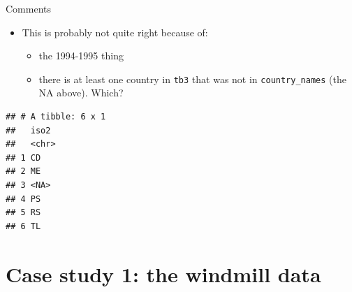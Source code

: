 \documentclass[
  ignorenonframetext,
]{beamer}
\newenvironment{Shaded}{\begin{snugshade}}{\end{snugshade}}
\newcommand{\DataTypeTok}[1]{\textcolor[rgb]{0.13,0.29,0.53}{#1}}
\newcommand{\KeywordTok}[1]{\textcolor[rgb]{0.13,0.29,0.53}{\textbf{#1}}}
\newcommand{\NormalTok}[1]{#1}
\newcommand{\OperatorTok}[1]{\textcolor[rgb]{0.81,0.36,0.00}{\textbf{#1}}}
\newcommand{\StringTok}[1]{\textcolor[rgb]{0.31,0.60,0.02}{#1}}
\providecommand{\tightlist}{%
  \setlength{\itemsep}{0pt}\setlength{\parskip}{0pt}}
\begin{document}
\begin{frame}[fragile]{Comments}
\protect\hypertarget{comments-11}{}

\begin{itemize}
\tightlist
\item
  This is probably not quite right because of:

  \begin{itemize}
  \tightlist
  \item
    the 1994-1995 thing
  \item
    there is at least one country in \texttt{tb3} that was not in
    \texttt{country\_names} (the NA above). Which?
  \end{itemize}
\end{itemize}

\footnotesize

\begin{Shaded}
\end{Shaded}

\begin{verbatim}
## # A tibble: 6 x 1
##   iso2 
##   <chr>
## 1 CD   
## 2 ME   
## 3 <NA> 
## 4 PS   
## 5 RS   
## 6 TL
\end{verbatim}

\normalsize

\end{frame}

\hypertarget{case-study-1-the-windmill-data}{%
\section{Case study 1: the windmill
data}\label{case-study-1-the-windmill-data}}
\end{document}
